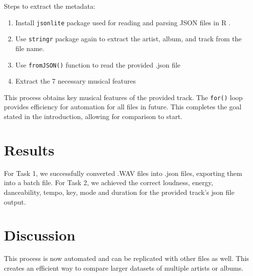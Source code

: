 \documentclass{article}\usepackage[]{graphicx}\usepackage[]{xcolor}
\begin{document}
\begin{multicols}{2}
Steps to extract the metadata:

\begin{enumerate}
  \item Install \texttt{jsonlite} package used for reading and parsing JSON files in R \citep{Ooms}.
  \item Use \texttt{stringr} package again to extract the artist, album, and track from the file name.
  \item Use \texttt{fromJSON()} function to read the provided .json file 
  \item Extract the 7 necessary musical features
\end{enumerate}

This process obtains key musical features of the provided track. The \texttt{for()} loop provides efficiency for automation for all files in future. This completes the goal stated in the introduction, allowing for comparison to start.

\section{Results}
For Task 1, we successfully converted .WAV files into .json files, exporting them into a batch file. For Task 2, we achieved the correct loudness, energy, danceability, tempo, key, mode and duration for the provided track's json file output. 

\section{Discussion}
 This process is now automated and can be replicated with other files as well. This creates an efficient way to compare larger datasets of multiple artists or albums. 
\columnbreak

\vspace{2em}

\begin{tiny}

\end{tiny}
\end{multicols}
\end{document}
